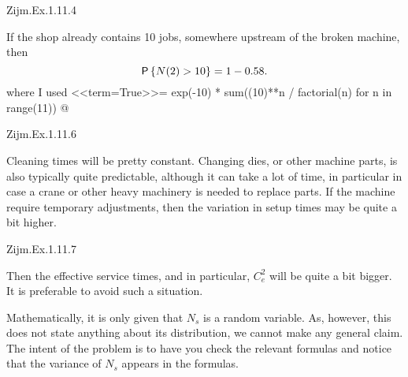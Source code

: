 \begin{exercise}
Zijm.Ex.1.11.4

 \begin{solution}
If the shop already contains 10 jobs, somewhere upstream of the broken machine, then 
   \begin{equation*}
     \P{N(2) > 10} = 1- 0.58.
   \end{equation*}
where  I used
<<term=True>>=
exp(-10) * sum((10)**n / factorial(n) for n in range(11))
@
\end{solution}
\end{exercise}

\begin{exercise}
Zijm.Ex.1.11.6
 \begin{solution}
   Cleaning times will be pretty constant. Changing dies, or other
   machine parts, is also typically quite predictable, although it can
   take a lot of time, in particular in case a crane or other heavy
   machinery is needed to replace parts. If the machine require
   temporary adjustments, then the variation in setup times may be
   quite a bit higher.
\end{solution}
\end{exercise}

\begin{exercise}
Zijm.Ex.1.11.7
 \begin{solution}
   Then the effective service times, and in particular, $C_e^2$ will
   be quite a bit bigger. It is preferable to avoid such a situation. 

   Mathematically, it is only given that $N_s$ is a random
   variable. As, however, this does not state anything about its
   distribution, we cannot make any general claim. The intent of the
   problem is to have you check the relevant formulas and notice that
   the variance of $N_s$ appears in the formulas.
\end{solution}
\end{exercise}

